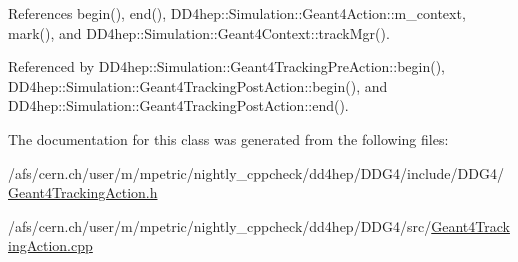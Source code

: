 References begin(), end(), D\+D4hep\+::\+Simulation\+::\+Geant4\+Action\+::m\+\_\+context, mark(), and D\+D4hep\+::\+Simulation\+::\+Geant4\+Context\+::track\+Mgr().



Referenced by D\+D4hep\+::\+Simulation\+::\+Geant4\+Tracking\+Pre\+Action\+::begin(), D\+D4hep\+::\+Simulation\+::\+Geant4\+Tracking\+Post\+Action\+::begin(), and D\+D4hep\+::\+Simulation\+::\+Geant4\+Tracking\+Post\+Action\+::end().



The documentation for this class was generated from the following files\+:\begin{DoxyCompactItemize}
\item 
/afs/cern.\+ch/user/m/mpetric/nightly\+\_\+cppcheck/dd4hep/\+D\+D\+G4/include/\+D\+D\+G4/\hyperlink{_geant4_tracking_action_8h}{Geant4\+Tracking\+Action.\+h}\item 
/afs/cern.\+ch/user/m/mpetric/nightly\+\_\+cppcheck/dd4hep/\+D\+D\+G4/src/\hyperlink{_geant4_tracking_action_8cpp}{Geant4\+Tracking\+Action.\+cpp}\end{DoxyCompactItemize}
